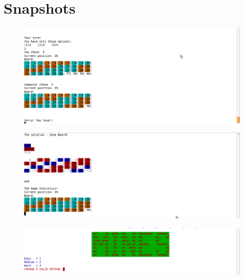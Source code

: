 \documentclass{article}
\begin{document}
\newpage
\section{Snapshots}


 
 \thispagestyle{empty}
\begin{figure}[htb]
\ifpdf
\includegraphics[scale=.30]{l6.png}
\else
\fi
\end{figure}


\thispagestyle{empty}
\begin{figure}[htb]
\ifpdf
\includegraphics[scale=.40]{l7.png}
\else
\fi
\end{figure}

\newpage
\thispagestyle{empty}
\begin{figure}[htb]
\ifpdf
\includegraphics[scale=.20]{m1.png}
\else
\fi
\end{figure}
\end{document}
